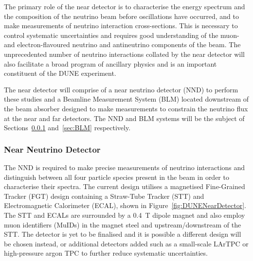 The primary role of the near detector is to characterise the energy spectrum and the composition of the neutrino beam before oscillations have occurred, and to make measurements of neutrino interaction cross-sections.  This is necessary to control systematic uncertainties and requires good understanding of the muon- and electron-flavoured neutrino and antineutrino components of the beam.  The unprecedented number of neutrino interactions collated by the near detector will also facilitate a broad program of ancillary physics and is an important constituent of the DUNE experiment.

The near detector will comprise of a near neutrino detector (NND) to perform these studies and a Beamline Measurement System (BLM) located downstream of the beam absorber designed to make measurements to constrain the neutrino flux at the near and far detectors.  The NND and BLM systems will be the subject of Sections~\ref{sec:NND} and~\ref{sec:BLM} respectively.

\subsubsection{Near Neutrino Detector}\label{sec:NND}

The NND is required to make precise measurements of neutrino interactions and distinguish between all four particle species present in the beam in order to characterise their spectra.  The current design utilises a magnetised Fine-Grained Tracker (FGT) design containing a Straw-Tube Tracker (STT) and Electromagnetic Calorimeter (ECAL), shown in Figure~\ref{fig:DUNENearDetector}.  The STT and ECALs are surrounded by a 0.4~T dipole magnet and also employ muon identifiers (MuIDs) in the magnet steel and upstream/downstream of the STT.  The detector is yet to be finalised and it is possible a different design will be chosen instead, or additional detectors added such as a small-scale LArTPC or high-pressure argon TPC to further reduce systematic uncertainties.


